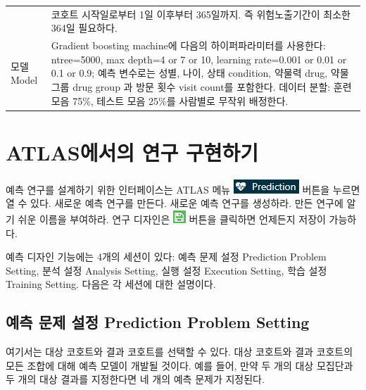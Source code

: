 \documentclass[10.5pt]{book}
\theoremstyle{definition}
\theoremstyle{definition}
\theoremstyle{definition}
\theoremstyle{remark}
\begin{document}
\begin{longtable}[]{@{}ll@{}}
\begin{minipage}[t]{0.23\columnwidth}
\end{minipage} & \begin{minipage}[t]{0.71\columnwidth}\raggedright\strut
코호트 시작일로부터 1일 이후부터 365일까지. 즉 위험노출기간이 최소한
364일 필요하다.\strut
\end{minipage}\tabularnewline
\begin{minipage}[t]{0.23\columnwidth}\raggedright\strut
모델 Model\strut
\end{minipage} & \begin{minipage}[t]{0.71\columnwidth}\raggedright\strut
Gradient boosting machine에 다음의 하이퍼파라미터를 사용한다:
ntree=5000, max depth=4 or 7 or 10, learning rate=0.001 or 0.01 or 0.1
or 0.9; 예측 변수로는 성별, 나이, 상태 condition, 약물력 drug, 약물 그룹
drug group 과 방문 횟수 visit count를 포함한다. 데이터 분할: 훈련 모음
75\%, 테스트 모음 25\%를 사람별로 무작위 배정한다.\strut
\end{minipage}\tabularnewline
\bottomrule
\end{longtable}

\section{ATLAS에서의 연구 구현하기}\label{atlas--}

예측 연구를 설계하기 위한 인터페이스는 ATLAS 메뉴
\includegraphics{images/PatientLevelPrediction/predictionButton.png}
버튼을 누르면 열 수 있다. 새로운 예측 연구를 만든다. 새로운 예측 연구를
생성하라. 만든 연구에 알기 쉬운 이름을 부여하라. 연구 디자인은
\includegraphics{images/PopulationLevelEstimation/save.png} 버튼을
클릭하면 언제든지 저장이 가능하다. 

예측 디자인 기능에는 4개의 세션이 있다: 예측 문제 설정 Prediction
Problem Setting, 분석 설정 Analysis Setting, 실행 설정 Execution
Setting, 학습 설정 Training Setting. 다음은 각 세션에 대한 설명이다.

\subsection{예측 문제 설정 Prediction Problem
Setting}\label{---prediction-problem-setting}

여기서는 대상 코호트와 결과 코호트를 선택할 수 있다. 대상 코호트와 결과
코호트의 모든 조합에 대해 예측 모델이 개발될 것이다. 예를 들어, 만약 두
개의 대상 모집단과 두 개의 대상 결과를 지정한다면 네 개의 예측 문제가
지정된다.
\end{document}
